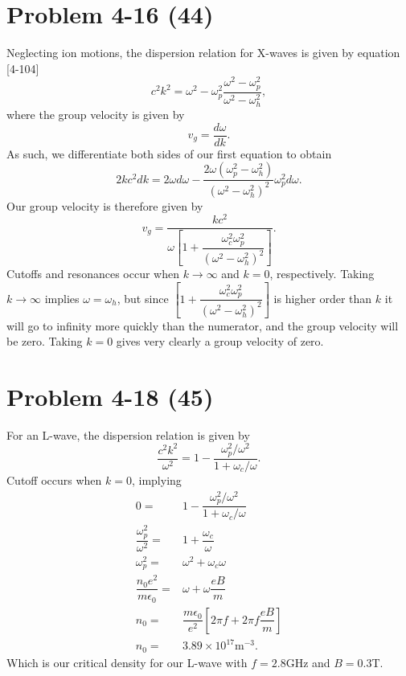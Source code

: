 \section*{Problem 4-16 (44)}
\label{sec:4-16}
Neglecting ion motions, the dispersion relation for X-waves is given by equation [4-104]
\begin{equation*}
	c^2k^2 = \omega^2 - \omega^2_p\dfrac{\omega^2 - \omega_p^2}{\omega^2 - \omega_h^2},
\end{equation*}
where the group velocity is given by
\begin{equation*}
	v_g = \dfrac{d\omega}{dk}.
\end{equation*}
As such, we differentiate both sides of our first equation to obtain
\begin{equation*}
	2kc^2dk = 2\omega d\omega - \dfrac{2\omega(\omega^2_p - \omega^2_h)}{(\omega^2 - \omega_h^2)^2}\omega_p^2d\omega.
\end{equation*}
Our group velocity is therefore given by
\begin{equation*}
	v_g = \dfrac{kc^2}{\omega\left[1 + \dfrac{\omega_c^2\omega_p^2}{(\omega^2 - \omega_h^2)^2} \right]}.
\end{equation*}
Cutoffs and resonances occur when \(k\to\infty \) and \(k=0\), respectively. Taking \(k\to\infty\) implies \(\omega=\omega_h \), but since \(\left[1 + \dfrac{\omega_c^2\omega_p^2}{(\omega^2 - \omega_h^2)^2} \right] \) is higher order than \(k\) it will go to infinity more quickly than the numerator, and the group velocity will be zero. Taking \(k=0\) gives very clearly a group velocity of zero.


\section*{Problem 4-18 (45)}
\label{sec:4-18}
For an L-wave, the dispersion relation is given by
\begin{equation*}
	\dfrac{c^2k^2}{\omega^2} = 1 - \dfrac{\omega_p^2/\omega^2}{1 + \omega_c/\omega}.
\end{equation*}
Cutoff occurs when \(k=0\), implying
\begin{align*}
	0=&1 - \dfrac{\omega_p^2/\omega^2}{1 + \omega_c/\omega} \\
	\dfrac{\omega_p^2}{\omega^2} =& 1 + \dfrac{\omega_c}{\omega} \\
	\omega_p^2 =& \omega^2 + \omega_c\omega \\
	\dfrac{n_0e^2}{m\epsilon_0} =& \omega + \omega\dfrac{eB}{m}\\
	n_0 =& \dfrac{m\epsilon_0}{e^2}\left[2\pi f + 2\pi f\dfrac{eB}{m} \right]\\
	n_0 =& 3.89 \times 10^{17}\text{m}^{-3}.
\end{align*}
Which is our critical density for our L-wave with \(f = 2.8\)GHz and \(B = 0.3\)T.

